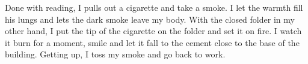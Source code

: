 		Done with reading, I pulls out a cigarette and take a smoke. I let the warmth fill his lungs and lets the dark smoke leave my body. With the
	closed folder in my other hand, I put the tip of the cigarette on the folder and set it on fire. I watch it burn for a moment, smile and let it fall
	to the cement close to the base of the building. Getting up, I toss my smoke and go back to work.
	
